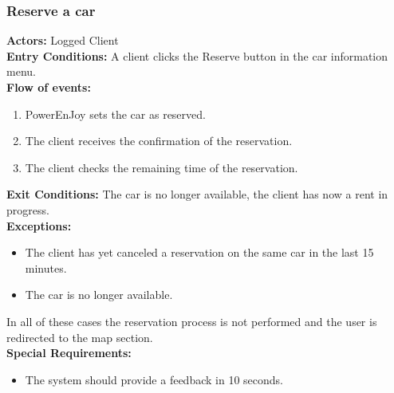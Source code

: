 \subsubsection{Reserve a car}
%
\textbf{Actors:}
Logged Client\\
%
\textbf{Entry Conditions:}
A client clicks the Reserve button in the car information menu.\\
%
\textbf{Flow of events:}
\begin{enumerate}
\item PowerEnJoy sets the car as reserved.
\item The client receives the confirmation of the reservation.
\item The client checks the remaining time of the reservation.  
\end{enumerate}
%
\textbf{Exit Conditions:}
The car is no longer available, the client has now a rent in progress.\\
%
\textbf{Exceptions:}
\begin{itemize}
\item The client has yet canceled a reservation on the same car in the last 15 minutes. 
\item The car is no longer available.
\end{itemize}
In all of these cases the reservation process is not performed and the user is redirected to the map section. \\
%
\textbf{Special Requirements:}
\begin{itemize}
\item The system should provide a feedback in 10 seconds.
\end{itemize}


